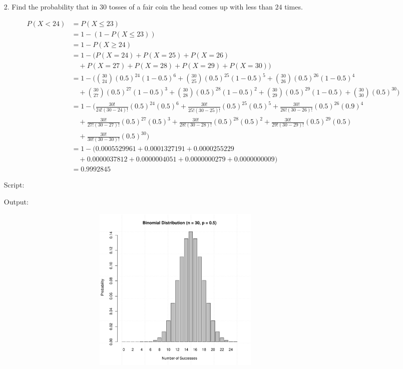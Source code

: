 \documentclass[a4paper,11pt,openright]{report}
\begin{document}
\begin{enumerate}
\pagebreak

\item[2.] Find the probability that in $30$ tosses of a fair coin the head comes up with
less than $24$ times.

\begin{equation*}
\begin{split}
P(X < 24) & = P(X \leq 23) \\
		  & = 1 - (1 - P(X \leq 23)) \\
		  & = 1 - P(X \geq 24) \\
		  & = 1 - \bigg( P(X = 24) + P(X = 25) + P(X = 26) \\
		  &\quad + P(X = 27) + P(X = 28) + P(X = 29) + P(X = 30) \bigg) \\
		  & = 1 - \Bigg( \binom{30}{24} (0.5)^{24} (1-0.5)^{6} + \binom{30}{25} (0.5)^{25} (1-0.5)^{5} + \binom{30}{26} (0.5)^{26} (1-0.5)^{4} \\
		  &\quad + \binom{30}{27} (0.5)^{27} (1-0.5)^{3} + \binom{30}{28} (0.5)^{28} (1-0.5)^{2} + \binom{30}{29} (0.5)^{29} (1-0.5) + \binom{30}{30} (0.5)^{30} \Bigg) \\
		  & = 1 - \Bigg( \frac{30!}{24! (30-24)!} (0.5)^{24} (0.5)^{6} +  \frac{30!}{25! (30-25)!} (0.5)^{25} (0.5)^{5} +  \frac{30!}{26! (30-26)!} (0.5)^{26} (0.9)^{4} \\
		  &\quad +  \frac{30!}{27! (30-27)!} (0.5)^{27} (0.5)^{3} +  \frac{30!}{28! (30-28)!} (0.5)^{28} (0.5)^{2} +  \frac{30!}{29! (30-29)!} (0.5)^{29} (0.5) \\
		  &\quad +  \frac{30!}{30! (30-30)!} (0.5)^{30} \Bigg) \\
		  & = 1 - \Big( 0.0005529961 + 0.0001327191 + 0.0000255229 \\
		  &\quad + 0.0000037812 + 0.0000004051 + 0.0000000279 + 0.0000000009 \Big) \\
		  & = 0.9992845
\end{split}
\end{equation*}

Script:


Output:


\begin{figure}[ht!]
\includegraphics[width=16cm,height=8cm,keepaspectratio]{plot2.pdf}
\centering
\end{figure}


\end{enumerate}
\end{document}
